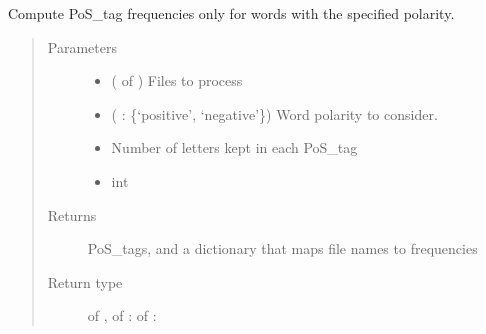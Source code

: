 \documentclass[letterpaper,10pt,english]{sphinxmanual}
\begin{document}
\begin{fulllineitems}
\begin{quote}
\begin{description}
\end{description}\end{quote}

\end{fulllineitems}


\begin{fulllineitems}
\label{\detokenize{analysis:loacore.analysis.frequencies.polarity_word_pos_tag_frequencies}}
Compute PoS\_tag frequencies only for words with the specified polarity.
\begin{quote}\begin{description}
\item[{Parameters}] \leavevmode\begin{itemize}
\item {} 
 ( of {\hyperref[\detokenize{classes:loacore.classes.classes.File}]{}}) \textendash{} Files to process

\item {} 
 ( : \{‘positive’, ‘negative’\}) \textendash{} Word polarity to consider.

\item {} 
 \textendash{} Number of letters kept in each PoS\_tag

\item {} 
 \textendash{} int

\end{itemize}

\item[{Returns}] \leavevmode
PoS\_tags, and a dictionary that maps file names to frequencies

\item[{Return type}] \leavevmode
{} of  ,  of  :  of  : 


\end{description}
\end{quote}
\end{fulllineitems}
\end{document}

